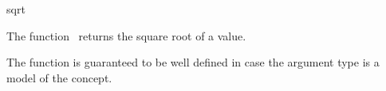 \begin{ccRefFunction}{sqrt}

\ccDefinition

The function \ccRefName\ returns the square root of a value.

The function is guaranteed to be well defined in case the argument type 
is a model of the  concept. 


{}



\ccSeeAlso

\\
\\

\end{ccRefFunction}
